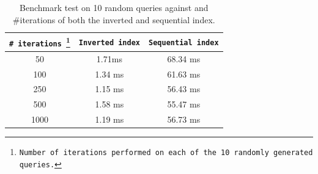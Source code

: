 \documentclass{article}
\begin{document}
\begin{table}[hbt!]
	\centering
	\begin{tabular}{c|c|c}
		\texttt{\# iterations \footnote{Number of iterations performed on each of the 10 randomly generated queries.}}& \texttt{Inverted index} & \texttt{Sequential index}  \\ \hline
		50 & 1.71ms  & 68.34 ms \\
		100 & 1.34 ms & 61.63 ms \\
		250 & 1.15 ms & 56.43 ms \\
		500 & 1.58 ms & 55.47 ms \\
		1000 & 1.19 ms & 56.73 ms
	\end{tabular}
	\caption{Benchmark test on 10 random queries against and \#iterations of both the inverted and sequential index.}
	\label{tab:1}
\end{table}
\end{document}
